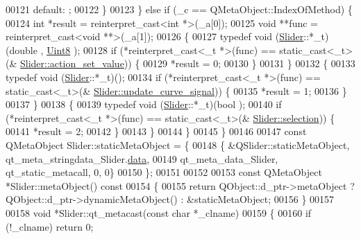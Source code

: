 \begin{DoxyCode}
00121         \textcolor{keywordflow}{default}: ;
00122         \}
00123     \} \textcolor{keywordflow}{else} \textcolor{keywordflow}{if} (\_c == QMetaObject::IndexOfMethod) \{
00124         \textcolor{keywordtype}{int} *result = \textcolor{keyword}{reinterpret\_cast<}\textcolor{keywordtype}{int} *\textcolor{keyword}{>}(\_a[0]);
00125         \textcolor{keywordtype}{void} **func = \textcolor{keyword}{reinterpret\_cast<}\textcolor{keywordtype}{void} **\textcolor{keyword}{>}(\_a[1]);
00126         \{
00127             \textcolor{keyword}{typedef} void (\hyperlink{a00077}{Slider}::*\_t)(double , \hyperlink{a00004_a979e3e23b9a449e69ab6a8a83b6042f8}{Uint8} );
00128             \textcolor{keywordflow}{if} (*reinterpret\_cast<\_t *>(func) == \textcolor{keyword}{static\_cast<}\_t\textcolor{keyword}{>}(&
      \hyperlink{a00077_a886f07f2c612121bec703581f9398a10}{Slider::action\_set\_value})) \{
00129                 *result = 0;
00130             \}
00131         \}
00132         \{
00133             \textcolor{keyword}{typedef} void (\hyperlink{a00077}{Slider}::*\_t)();
00134             \textcolor{keywordflow}{if} (*reinterpret\_cast<\_t *>(func) == \textcolor{keyword}{static\_cast<}\_t\textcolor{keyword}{>}(&
      \hyperlink{a00077_a49696761b5c638a3b2d58b16af9773e0}{Slider::update\_curve\_signal})) \{
00135                 *result = 1;
00136             \}
00137         \}
00138         \{
00139             \textcolor{keyword}{typedef} void (\hyperlink{a00077}{Slider}::*\_t)(bool );
00140             \textcolor{keywordflow}{if} (*reinterpret\_cast<\_t *>(func) == \textcolor{keyword}{static\_cast<}\_t\textcolor{keyword}{>}(&
      \hyperlink{a00077_a66bf875d43a16cf37527ab75c439fd8e}{Slider::selection})) \{
00141                 *result = 2;
00142             \}
00143         \}
00144     \}
00145 \}
00146 
00147 \textcolor{keyword}{const} QMetaObject Slider::staticMetaObject = \{
00148     \{ &QSlider::staticMetaObject, qt\_meta\_stringdata\_Slider.\hyperlink{a00070_a28e23ecab9373bb818a81f9a092a52de}{data},
00149       qt\_meta\_data\_Slider,  qt\_static\_metacall, 0, 0\}
00150 \};
00151 
00152 
00153 \textcolor{keyword}{const} QMetaObject *Slider::metaObject()\textcolor{keyword}{ const}
00154 \textcolor{keyword}{}\{
00155     \textcolor{keywordflow}{return} QObject::d\_ptr->metaObject ? QObject::d\_ptr->dynamicMetaObject() : &staticMetaObject;
00156 \}
00157 
00158 \textcolor{keywordtype}{void} *Slider::qt\_metacast(\textcolor{keyword}{const} \textcolor{keywordtype}{char} *\_clname)
00159 \{
00160     \textcolor{keywordflow}{if} (!\_clname) \textcolor{keywordflow}{return} 0;

\end{DoxyCode}
